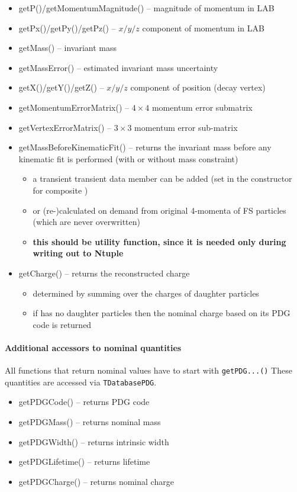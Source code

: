 \begin{itemize}
  \item {\bluett getP()/getMomentumMagnitude()} -- magnitude of momentum in LAB
  \item {\bluett getPx()/getPy()/getPz()} -- $x/y/z$ component of momentum in LAB
  \item {\bluett getMass()} -- invariant mass
  \item {\bluett getMassError()} -- estimated invariant mass uncertainty
  \item {\bluett getX()/getY()/getZ()} -- $x/y/z$ component of position (decay vertex)
  \item {\bluett getMomentumErrorMatrix()}  -- $4\times4$ momentum error submatrix
  \item {\bluett getVertexErrorMatrix()}  -- $3\times3$ momentum error sub-matrix
  \item {\bluett getMassBeforeKinematicFit()} -- returns the invariant mass before any kinematic fit is performed (with or without mass constraint)
  \begin{itemize}
   \item a transient transient data member can be added (set in the constructor for composite \particle)
   \item or (re-)calculated on demand from original 4-momenta of FS particles (which are never overwritten)
   \item {\bf this should be utility function, since it is needed only during writing out to Ntuple}
  \end{itemize}
  \item {\bluett getCharge()} -- returns the reconstructed charge 
  \begin{itemize}
   \item determined by summing over the charges of daughter particles
   \item if \particle has no daughter particles then the nominal charge based on its PDG code is returned
  \end{itemize}
\end{itemize}

\paragraph{Additional accessors to nominal quantities} All functions that return nominal values have to start with {\tt getPDG...()} These 
quantities are accessed via {\tt TDatabasePDG}.
\begin{itemize}
 \item {\bluett getPDGCode()} -- returns PDG code
 \item {\bluett getPDGMass()} -- returns nominal mass
 \item {\bluett getPDGWidth()} -- returns intrinsic width
 \item {\bluett getPDGLifetime()} -- returns lifetime
 \item {\bluett getPDGCharge()} -- returns nominal charge
\end{itemize}

